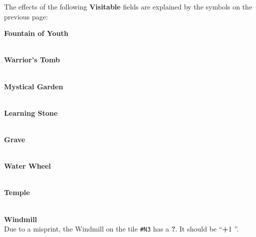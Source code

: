 \pagebreak

The effects of the following \textbf{Visitable} fields are explained by the symbols on the previous page:

\begin{multicols*}{2}
{\centering

  \phantom{j}\textbf{Fountain of Youth}\\
  \\

  \bigskip

  \phantom{j}\textbf{Warrior's Tomb}\\
  \\

  \bigskip

  \textbf{Mystical Garden}\\
  \\

  \bigskip

  \textbf{Learning Stone}\\
  \\

  \bigskip

  \phantom{j}\textbf{Grave}\phantom{j}\\
  \\
  \vspace*{\fill}
  \filbreak

  \phantom{j}\textbf{Water Wheel}\phantom{j}\\
  \\

  \bigskip

  \phantom{j}\textbf{Temple}\phantom{j}\\
  \\

  \bigskip

  \phantom{j}\textbf{Windmill}\phantom{j}\\
  {\small Due to a misprint, the Windmill on the tile \texttt{\#N3} has a \textbf{?}. It should be ``\textbf{+}1 ''.}

  \bigskip

}
\end{multicols*}
